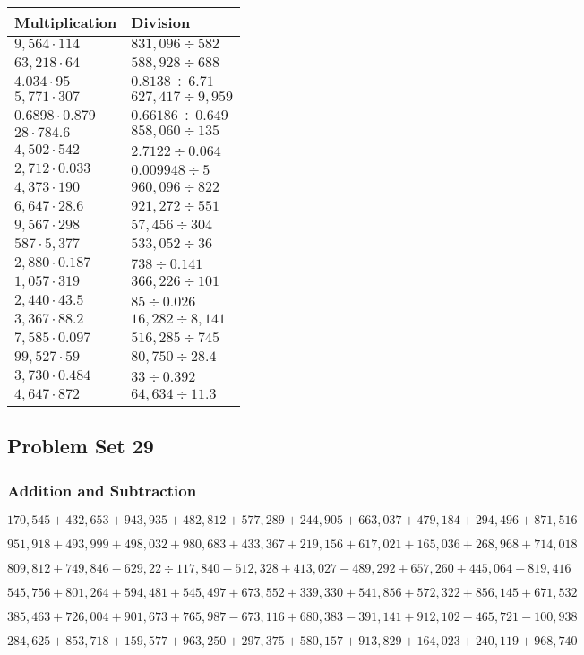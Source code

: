 \begin{longtable}[]{@{}ll@{}}
\toprule
Multiplication & Division\tabularnewline
\midrule
\endhead
\(9,564\cdot114\) & \(831,096÷582\)\tabularnewline
\(63,218\cdot64\) & \(588,928÷688\)\tabularnewline
\(4.034\cdot95\) & \(0.8138 ÷6.71\)\tabularnewline
\(5,771\cdot307\) & \(627,417÷9,959\)\tabularnewline
\(0.6898\cdot0.879\) & \(0.66186÷0.649\)\tabularnewline
\(28\cdot784.6\) & \(858,060÷135\)\tabularnewline
\(4,502\cdot542\) & \(2.7122÷0.064\)\tabularnewline
\(2,712\cdot0.033\) & \(0.009948÷5\)\tabularnewline
\(4,373\cdot190\) & \(960,096÷822\)\tabularnewline
\(6,647\cdot28.6\) & \(921,272÷551\)\tabularnewline
\(9,567\cdot298\) & \(57,456÷304\)\tabularnewline
\(587\cdot5,377\) & \(533,052÷36\)\tabularnewline
\(2,880\cdot0.187\) & \(738÷0.141\)\tabularnewline
\(1,057\cdot319\) & \(366,226÷101\)\tabularnewline
\(2,440\cdot43.5\) & \(85÷0.026\)\tabularnewline
\(3,367\cdot88.2\) & \(16,282÷8,141\)\tabularnewline
\(7,585\cdot0.097\) & \(516,285÷745\)\tabularnewline
\(99,527\cdot59\) & \(80,750÷28.4\)\tabularnewline
\(3,730\cdot0.484\) & \(33÷0.392\)\tabularnewline
\(4,647\cdot872\) & \(64,634÷11.3\)\tabularnewline
\bottomrule
\end{longtable}

\hypertarget{problem-set-29-5}{%
\subsection{Problem Set 29}\label{problem-set-29-5}}

\hypertarget{addition-and-subtraction-334}{%
\subsubsection{Addition and
Subtraction}\label{addition-and-subtraction-334}}

\(170,545+432,653+943,935+482,812+577,289+244,905+663,037+479,184+294,496+ 871,516\)

\(951,918+493,999+498,032+980,683+433,367+219,156+617,021+165,036+268,968+714,018\)

\(809,812+749,846-629,22÷117,840-512,328+413,027-489,292+657,260+445,064+819,416\)

\(545,756+801,264+594,481+545,497+673,552+339,330+541,856+572,322+856,145+671,532\)

\(385,463+726,004+901,673+765,987-673,116+680,383-391,141+912,102-465,721-100,938\)

\(284,625+853,718+159,577+963,250+297,375+580,157+913,829+164,023+240,119+968,740\)

